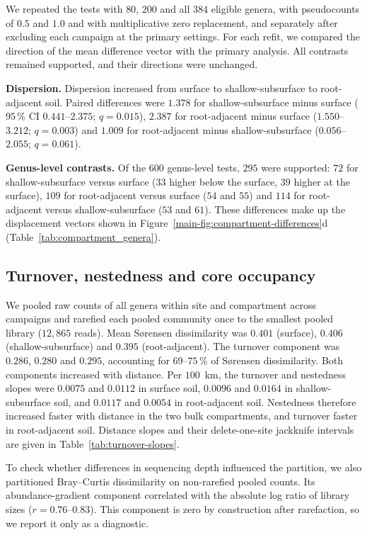 \documentclass[11pt]{article}
\begin{document}
We repeated the tests with $80$, $200$ and all $384$ eligible genera, with pseudocounts of $0.5$ and $1.0$ and with multiplicative zero replacement, and separately after excluding each campaign at the primary settings. For each refit, we compared the direction of the mean difference vector with the primary analysis. All contrasts remained supported, and their directions were unchanged.

\textbf{Dispersion.} Dispersion increased from surface to shallow-subsurface to root-adjacent soil. Paired differences were $1.378$ for shallow-subsurface minus surface ($95\,\%$ CI $0.441$--$2.375$; $q=0.015$), $2.387$ for root-adjacent minus surface ($1.550$--$3.212$; $q=0.003$) and $1.009$ for root-adjacent minus shallow-subsurface ($0.056$--$2.055$; $q=0.061$).

\textbf{Genus-level contrasts.} Of the $600$ genus-level tests, $295$ were supported: $72$ for shallow-subsurface versus surface ($33$ higher below the surface, $39$ higher at the surface), $109$ for root-adjacent versus surface ($54$ and $55$) and $114$ for root-adjacent versus shallow-subsurface ($53$ and $61$). These differences make up the displacement vectors shown in Figure~\ref{main-fig:compartment-differences}d (Table~\ref{tab:compartment_genera}).



\subsection{Turnover, nestedness and core occupancy}\label{sup:beta_turnover}
We pooled raw counts of all genera within site and compartment across campaigns and rarefied each pooled community once to the smallest pooled library ($12{,}865$ reads). Mean S\o{}rensen dissimilarity was $0.401$ (surface), $0.406$ (shallow-subsurface) and $0.395$ (root-adjacent). The turnover component was $0.286$, $0.280$ and $0.295$, accounting for $69$--$75\,\%$ of S\o{}rensen dissimilarity. Both components increased with distance. Per $100$~km, the turnover and nestedness slopes were $0.0075$ and $0.0112$ in surface soil, $0.0096$ and $0.0164$ in shallow-subsurface soil, and $0.0117$ and $0.0054$ in root-adjacent soil. Nestedness therefore increased faster with distance in the two bulk compartments, and turnover faster in root-adjacent soil.
Distance slopes and their delete-one-site jackknife intervals are given in Table~\ref{tab:turnover-slopes}.


To check whether differences in sequencing depth influenced the partition, we also partitioned Bray--Curtis dissimilarity on non-rarefied pooled counts. Its abundance-gradient component correlated with the absolute log ratio of library sizes ($r=0.76$--$0.83$). This component is zero by construction after rarefaction, so we report it only as a diagnostic.
\end{document}
